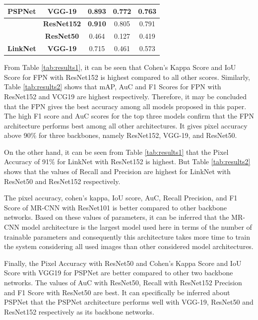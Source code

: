 \documentclass[a4paper,12pt]{spieman}  %
\begin{document}
\begin{spacing}{1}
\begin{table}[]
\begin{tabular}{|c|c|c|c|c|}
\multirow{-3}{*}{\textbf{PSPNet}} & \textbf{VGG-19}     & 0.893          & 0.772          & 0.763\\ \hline
{\color[HTML]{222222} }           & \textbf{ResNet152}  & \textbf{0.910} & 0.805          & 0.791          \\ \cline{2-5}
{\color[HTML]{222222} }           &   \textbf{ResNet50} &   0.464 &   0.127 &   0.419          \\ \cline{2-5}
\multirow{-3}{*}{{\color[HTML]{222222} \textbf{LinkNet}}} & \textbf{VGG-19}     & 0.715          & 0.461          & 0.573 \\ \hline
\end{tabular}
\end{table}
\egroup
\par From Table \ref{tab:results1}, it can be seen that Cohen’s Kappa Score and IoU Score for FPN with ResNet152 is highest compared to all other scores. Similarly, Table \ref{tab:results2} shows that mAP, AuC and F1 Scores for FPN with ResNet152 and VCG19 are highest respectively. Therefore, it may be concluded that the FPN gives the best accuracy among all models proposed in this paper. The high F1 score and AuC scores for the top three models confirm that the FPN architecture performs best among all other architectures. It gives pixel accuracy above 90\% for three backbones, namely ResNet152, VGG-19, and ResNet50.
\par On the other hand, it can be seen from Table \ref{tab:results1} that the Pixel Accuracy of 91\% for LinkNet with ResNet152 is highest. But Table \ref{tab:results2} shows that the values of Recall and Precision are highest for LinkNet with ResNet50 and ResNet152 respectively.
\par The pixel accuracy, cohen's kappa, IoU score, AuC, Recall Precision, and F1 Score of MR-CNN with ResNet101 is better compared to other backbone networks. Based on these values of parameters, it can be inferred that the MR-CNN model architecture is the largest model used here in terms of the number of trainable parameters and consequently this architecture takes more time to train the system considering all used images than other considered model architectures.
\par Finally, the Pixel Accuracy with ResNet50 and Cohen’s Kappa Score and IoU Score with VGG19 for PSPNet are better compared to other two backbone networks. The values of AuC with ResNet50,  Recall with ResNet152 Precision and F1 Score with ResNet50 are best. It can specifically be inferred about PSPNet that the PSPNet architecture performs well with VGG-19, ResNet50 and ResNet152 respectively as its backbone networks.

\end{spacing}
\end{document}
